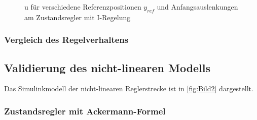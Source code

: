 \documentclass[
	pagesize,
	fontsize=12pt,
	paper=a4,
	oneside,
   reqno
]{scrartcl}
\begin{document}
\begin{figure}[H]
    \centering
    \caption[u für Regler mit I-Regelung]{u für verschiedene Referenzpositionen $y_{ref}$ und Anfangsauslenkungen am Zustandsregler mit I-Regelung}
    \label{fig:Bild20}
\end{figure}

\subsubsection{Vergleich des Regelverhaltens}

\subsection{Validierung des nicht-linearen Modells}

Das Simulinkmodell der nicht-linearen Reglerstrecke ist in \autoref{fig:Bild2} dargestellt.

\subsubsection{Zustandsregler mit Ackermann-Formel}
\end{document}
